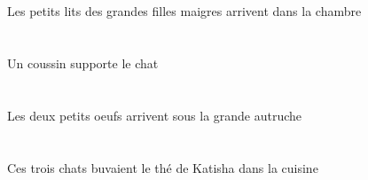 \begin{exe}
   \DEFPlAbsP{}    \DEFPlOblP{}   \grandCPlP{}   \maigreCPlP{}   \filleCPlOblP{}   \DEP{}   \petitDPlP{}   \litDPlAbsP{}    \DEFSgOblP{}   \chambreBSgOblP{}   \DANSP{}  \arriverViPrsDPlP{} \\
   \DEFPlAbsG{}    \DEFPlOblG{}   \grandCPlG{}   \maigreCPlG{}   \filleCPlOblG{}   \DEG{}   \petitDPlG{}   \litDPlAbsG{}    \DEFSgOblG{}   \chambreBSgOblG{}   \DANSG{}  \arriverViPrsDPlG{} \\
 Les petits lits des grandes filles maigres arrivent dans la chambre
\ex\glll
   \INDSgErg{}   \coussinBSgErg{}   \DEFSgAbs{}   \chatDSgAbs{}  \supporterVtPrsDSg{} \\
   \INDSgErgP{}   \coussinBSgErgP{}   \DEFSgAbsP{}   \chatDSgAbsP{}  \supporterVtPrsDSgP{} \\
   \INDSgErgG{}   \coussinBSgErgG{}   \DEFSgAbsG{}   \chatDSgAbsG{}  \supporterVtPrsDSgG{} \\
 Un coussin supporte le chat
\ex\glll
   \DEFDuAbs{}   \petitCDu{}   \oeufCDuAbs{}    \DEFSgObl{}   \grandBSg{}   \autrucheBSgObl{}   \SOUS{}  \arriverViPrsCDu{} \\
   \DEFDuAbsP{}   \petitCDuP{}   \oeufCDuAbsP{}    \DEFSgOblP{}   \grandBSgP{}   \autrucheBSgOblP{}   \SOUSP{}  \arriverViPrsCDuP{} \\
   \DEFDuAbsG{}   \petitCDuG{}   \oeufCDuAbsG{}    \DEFSgOblG{}   \grandBSgG{}   \autrucheBSgOblG{}   \SOUSG{}  \arriverViPrsCDuG{} \\
 Les deux petits oeufs arrivent sous la grande autruche
\ex\glll
    \DEFSgObl{}   \cuisineDSgObl{}   \DANS{}   \DEMPlErg{}   \troisDPl{}   \chatDPlErg{}   \DEFSgAbs{}    \INDSgObl{}   \KatishaASgObl{}   \DE{}   \theBSgAbs{}  \boireVtPstBSg{} \\
    \DEFSgOblP{}   \cuisineDSgOblP{}   \DANSP{}   \DEMPlErgP{}   \troisDPlP{}   \chatDPlErgP{}   \DEFSgAbsP{}    \INDSgOblP{}   \KatishaASgOblP{}   \DEP{}   \theBSgAbsP{}  \boireVtPstBSgP{} \\
    \DEFSgOblG{}   \cuisineDSgOblG{}   \DANSG{}   \DEMPlErgG{}   \troisDPlG{}   \chatDPlErgG{}   \DEFSgAbsG{}    \INDSgOblG{}   \KatishaASgOblG{}   \DEG{}   \theBSgAbsG{}  \boireVtPstBSgG{} \\
 Ces trois chats buvaient le thé de Katisha dans la cuisine
\ex\glll
    \INDPlObl{}   \coussinBPlObl{}   \SUR{}   \DEFPlErg{}   \infirmiereAPlErg{}   \INDPlAbs{}   \oeufCPlAbs{}  \mangerVtPrsCPl{} \\
    \INDPlOblP{}   \coussinBPlOblP{}   \SURP{}   \DEFPlErgP{}   \infirmiereAPlErgP{}   \INDPlAbsP{}   \oeufCPlAbsP{}  \mangerVtPrsCPlP{} \\

\end{exe}
